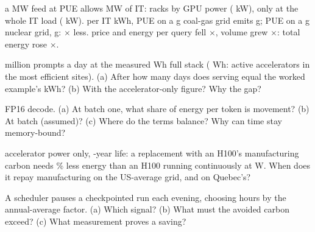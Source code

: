 \documentclass{studysheet}
\begin{document}
\begin{rightcol}
%
  {\assumed{} a  MW feed at PUE  allows  MW of IT:  racks
   by GPU power ( kW), only  at the whole IT load ( kW).}{}
%
  {\assumed{} per IT kWh, PUE  on a  g coal-gas grid emits  g; PUE
    on a  g nuclear grid,  g: $\times$ less.}{}
%
  {\assumed{} price and energy per query fell $\times$, volume grew $\times$: total energy
   rose $\times$.}{}

\vspace{4pt}
\begin{qs}
\item \assumed{}  million prompts a day at the measured  Wh full stack ( Wh:
  active accelerators in the most efficient sites). (a) After how many days does serving equal the worked example's
   kWh? (b) With the accelerator-only figure? Why the gap?
\item FP16 decode. (a) At batch one, what share of energy per token is
  movement? (b) At batch  (assumed)? (c) Where do the terms balance? Why can time stay
  memory-bound?
\item \assumed{} accelerator power only, -year life: a replacement with an H100's manufacturing carbon needs \% less energy than an
  H100 running continuously at  W. When does it repay manufacturing on the US-average grid,
  and on Quebec's?
\item A scheduler pauses a checkpointed run each evening, choosing hours by the annual-average
  factor. (a) Which signal? (b) What must the avoided carbon exceed? (c) What
  measurement proves a saving?
\end{qs}
\end{rightcol}
\end{document}
